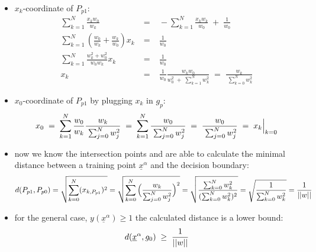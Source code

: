 \documentclass[10pt,a4paper]{article}
\begin{document}
\begin{enumerate}[a)]
\begin{itemize}
\item $x_k$-coordinate of $P_{p1}$:
\begin{eqnarray}
\sum_{k=1}^N \frac{x_k w_0}{w_k} \;&=&\; -\sum_{k=1}^N \frac{x_k w_k}{w_0}\;+\;\frac{1}{w_0} \\
\sum_{k=1}^N (\frac{w_0}{w_k}+\frac{w_k}{w_0})x_k \;&=&\; \frac{1}{w_0} \\
\sum_{k=1}^N \frac{w_k^2 + w_0^2}{w_0 w_k}x_k \;&=&\; \frac{1}{w_0} \\
x_k \;&=&\; \frac{1}{w_0}\frac{w_k w_0}{w_0^2\;+\;\sum_{k=1}^{N} w_k^2} \;=\; \frac{w_k}{\;\sum_{k=0}^{N} w_k^2}
\end{eqnarray}
\item $x_0$-coordinate of $P_{p1}$ by plugging $x_k$ in $g_p$:
\begin{eqnarray}
x_0\;=\; \sum_{k=1}^N \frac{w_0}{w_k} \frac{w_k}{\;\sum_{j=0}^{N} w_j^2} \;=\; \sum_{k=1}^N \frac{w_0}{\;\sum_{j=0}^{N} w_j^2} \;=\; \frac{w_0}{\;\sum_{j=0}^{N} w_j^2} \;=\; x_k\Big{|}_{k=0}
\end{eqnarray}
\item now we know the intersection points and are able to calculate the minimal distance between a training point $\underline{x}^{\alpha}$
and the decision boundary:
\begin{eqnarray}
d(P_{p1},P_{p0}) = \sqrt{\sum_{k=0}^N (x_{k,P_{p1}})^2} = \sqrt{\sum_{k=0}^N \Big{(}\frac{w_k}{\sum_{j=0}^N w_j^2}\Big{)}^2} = \sqrt{ \frac{\sum_{k=0}^N w_k^2}{(\sum_{k=0}^N w_k^2)^2}} = \sqrt{ \frac{1}{\sum_{k=0}^N w_k^2}} = \frac{1}{\small{||}w\small{||}}
\end{eqnarray}
\item for the general case, $y(\underline{x}^{\alpha})\geq 1$ the calculated distance is a lower bound:
\begin{eqnarray}
d(\underline{x}^{\alpha},g_0)\;\geq\; \frac{1}{\small{||}w\small{||}}
\end{eqnarray}

\end{itemize}

\end{enumerate}
\end{document}
